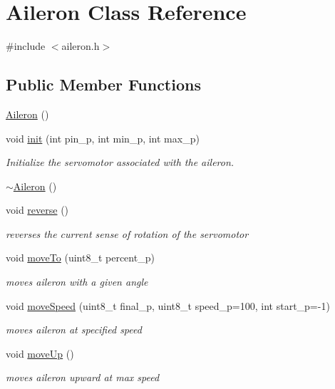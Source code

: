 \hypertarget{class_aileron}{}\section{Aileron Class Reference}
\label{class_aileron}


{\ttfamily \#include $<$aileron.\+h$>$}

\subsection*{Public Member Functions}
\begin{DoxyCompactItemize}
\item 
\hyperlink{class_aileron_ad2f851e39ec1eb19aeb0fbe2bdf4ef9c}{Aileron} ()
\item 
void \hyperlink{class_aileron_ad28b0e5e53705b1f43a3fa73c0765a96}{init} (int pin\+\_\+p, int min\+\_\+p, int max\+\_\+p)
\begin{DoxyCompactList}\small\item\em Initialize the servomotor associated with the aileron. \end{DoxyCompactList}\item 
\hyperlink{class_aileron_af05fcc71c65e31b919612cce2b0a5449}{$\sim$\+Aileron} ()
\item 
void \hyperlink{class_aileron_a5d5579971f2679d708d01657d63da414}{reverse} ()
\begin{DoxyCompactList}\small\item\em reverses the current sense of rotation of the servomotor \end{DoxyCompactList}\item 
void \hyperlink{class_aileron_a54db168cd8d880e8ec4b49af69ad70ae}{move\+To} (uint8\+\_\+t percent\+\_\+p)
\begin{DoxyCompactList}\small\item\em moves aileron with a given angle \end{DoxyCompactList}\item 
void \hyperlink{class_aileron_a0873615152c2c2811e6c15fb7ce32539}{move\+Speed} (uint8\+\_\+t final\+\_\+p, uint8\+\_\+t speed\+\_\+p=100, int start\+\_\+p=-\/1)
\begin{DoxyCompactList}\small\item\em moves aileron at specified speed \end{DoxyCompactList}\item 
void \hyperlink{class_aileron_abeee29a990a1a9b3d8bc884991b7221f}{move\+Up} ()
\begin{DoxyCompactList}\small\item\em moves aileron upward at max speed \end{DoxyCompactList}\item 

\end{DoxyCompactItemize}

